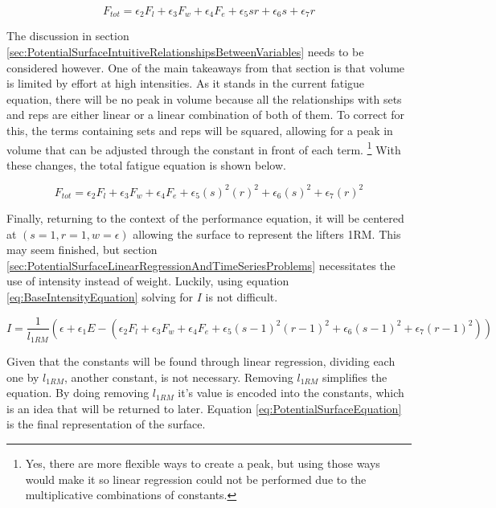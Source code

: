\begin{equation*}
	F_{tot}=\epsilon_2 F_l+\epsilon_3 F_w+\epsilon_4 F_e+\epsilon_5 sr+\epsilon_6 s+\epsilon_7 r
\end{equation*}

The discussion in section \ref{sec:PotentialSurfaceIntuitiveRelationshipsBetweenVariables} needs to be considered however. One of the main takeaways from that section is that volume is limited by effort at high intensities. As it stands in the current fatigue equation, there will be no peak in volume because all the relationships with sets and reps are either linear or a linear combination of both of them. To correct for this, the terms containing sets and reps will be squared, allowing for a peak in volume that can be adjusted through the constant in front of each term. \footnote{Yes, there are more flexible ways to create a peak, but using those ways would make it so linear regression could not be performed due to the multiplicative combinations of constants.} With these changes, the total fatigue equation is shown below.

\begin{equation}
	\label{eq:TotalFatigue}
	F_{tot}=\epsilon_2 F_l+\epsilon_3 F_w+\epsilon_4 F_e+\epsilon_5 (s)^2(r)^2+\epsilon_6 (s)^2+\epsilon_7 (r)^2
\end{equation}

Finally, returning to the context of the performance equation, it will be centered at $(s=1,r=1,w=\epsilon)$ allowing the surface to represent the lifters 1RM. This may seem finished, but section \ref{sec:PotentialSurfaceLinearRegressionAndTimeSeriesProblems} necessitates the use of intensity instead of weight. Luckily, using equation \ref{eq:BaseIntensityEquation} solving for $I$ is not difficult. 

\begin{equation*}
	I=\frac{1}{l_{1RM}}\left( 
		\epsilon+\epsilon_1 E-\left( 
			\epsilon_2 F_l+\epsilon_3 F_w+\epsilon_4 F_e+\epsilon_5 (s-1)^2(r-1)^2+\epsilon_6 (s-1)^2+\epsilon_7 (r-1)^2
		\right)
	\right)
\end{equation*}

Given that the constants will be found through linear regression, dividing each one by $l_{1RM}$, another constant, is not necessary. Removing $l_{1RM}$ simplifies the equation. By doing removing $l_{1RM}$ it's value is encoded into the constants, which is an idea that will be returned to later. Equation \ref{eq:PotentialSurfaceEquation} is the final representation of the surface.

